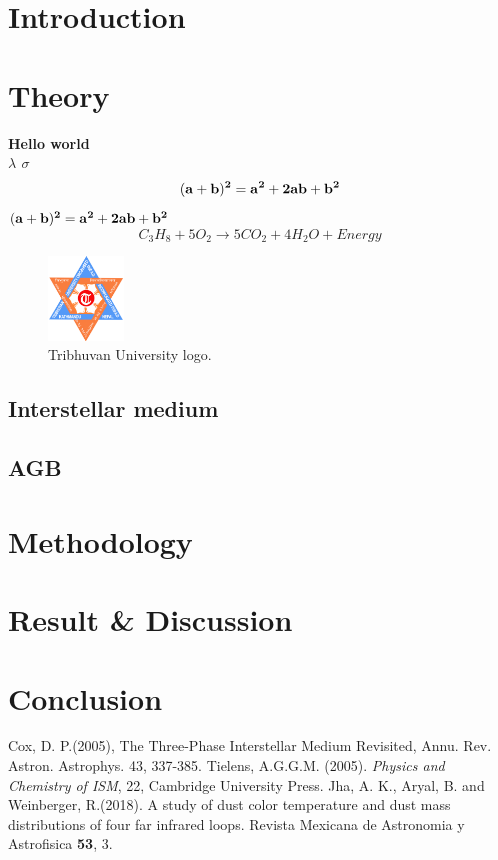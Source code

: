 \documentclass[12pt,a4paper]{report}
\begin{document}
\chapter{Introduction}
\chapter{Theory}
	\bfseries Hello world\\$\lambda$ $\sigma$
\begin{equation}
\bf (a+b)^2= a^2+2ab+b^2
\end{equation}
$\bf (a+b)^2= a^2+2ab+b^2$\cite{akj}
\\
\begin{equation}
C_3H_8+ 5O_2 \xrightarrow{} 5CO_2+ 4H_2O + Energy
\end{equation}

\begin{figure}[h!]
	\centering
	\includegraphics[width=2cm]{logo}
	\caption{Tribhuvan University logo\cite{5}.}
\end{figure}
\section{Interstellar medium}
\section{AGB}
\chapter{Methodology}
\chapter{Result \& Discussion}
\chapter{Conclusion}
\begin{thebibliography}{}
 Cox, D. P.(2005), The Three-Phase Interstellar Medium Revisited, Annu. Rev. Astron. Astrophys. 43, 337-385.
  Tielens, A.G.G.M. (2005). \emph{ Physics and Chemistry of ISM}, 22, Cambridge University Press.
 Jha, A. K.,   Aryal, B. and  Weinberger, R.(2018). A study of dust color temperature and dust mass distributions of
four far infrared loops. Revista Mexicana de Astronomia y Astrofisica \textbf{53}, 3.
\end{thebibliography}
\end{document}
